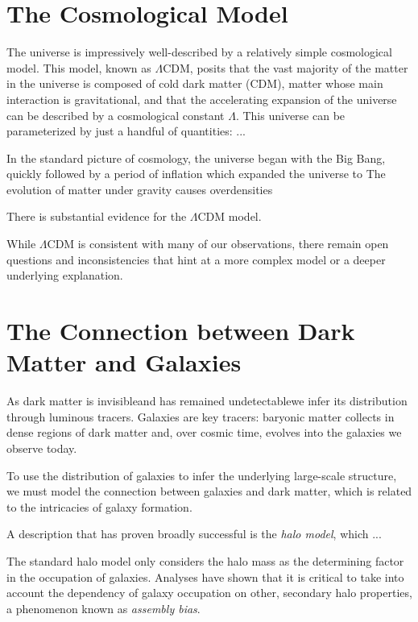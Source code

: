 \graphicspath{{figures/figures_intro/}}


\section{The Cosmological Model}

The universe is impressively well-described by a relatively simple cosmological model.
This model, known as $\Lambda$CDM, posits that the vast majority of the matter in the universe is composed of cold dark matter (CDM), matter whose main interaction is gravitational, and that the accelerating expansion of the universe can be described by a cosmological constant $\Lambda$.
This universe can be parameterized by just a handful of quantities: ... 

In the standard picture of cosmology, the universe began with the Big Bang, quickly followed by a period of inflation which expanded the universe to 
The evolution of matter under gravity causes overdensities 


There is substantial evidence for the $\Lambda$CDM model.


While $\Lambda$CDM is consistent with many of our observations, there remain open questions and inconsistencies that hint at a more complex model or a deeper underlying explanation.




\section{The Connection between Dark Matter and Galaxies}

As dark matter is invisible{\emdash}and has remained undetectable{\emdash}we infer its distribution through luminous tracers.
Galaxies are key tracers: baryonic matter collects in dense regions of dark matter and, over cosmic time, evolves into the galaxies we observe today.

To use the distribution of galaxies to infer the underlying large-scale structure, we must model the connection between galaxies and dark matter, which is related to the intricacies of galaxy formation.

A description that has proven broadly successful is the \emph{halo model}, which ...

The standard halo model only considers the halo mass as the determining factor in the occupation of galaxies.
Analyses have shown that it is critical to take into account the dependency of galaxy occupation on other, secondary halo properties, a phenomenon known as \emph{assembly bias}.



